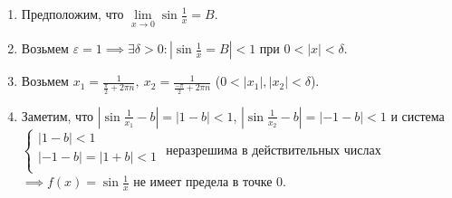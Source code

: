 \documentclass{article}
\begin{document}
    \begin{enumerate}
        \item Предположим, что \(\displaystyle \lim\limits_{x \to 0}\sin{\frac{1}{x}} = B\).
        \item Возьмем \(\varepsilon = 1 \implies \exists \delta > 0: \left \vert \sin{\frac{1}{x}} = B \right \vert < 1\) при \(0 < |x| < \delta\).
        \item Возьмем \(\displaystyle x_{1} = \frac{1}{\frac{\pi}{2} + 2\pi n},\ x_{2} = \frac{1}{\frac{-\pi}{2} + 2\pi n}\) (\(0 < |x_{1}|, |x_{2}| < \delta\)).
        \item Заметим, что \(\displaystyle \left \vert \sin{\frac{1}{x_{1}}} - b \right \vert = |1 - b| < 1\), \(\displaystyle \left \vert \sin{\frac{1}{x_{2}}} - b \right \vert = |-1-b| < 1\) и система
        \(\begin{cases}
            |1 - b| < 1\\
            | -1 - b| = |1 + b| < 1\\  
        \end{cases}\) неразрешима в действительных числах \(\implies f(x) = \sin{\frac{1}{x}}\) не имеет предела в точке 0.
    \end{enumerate}
\end{document}
